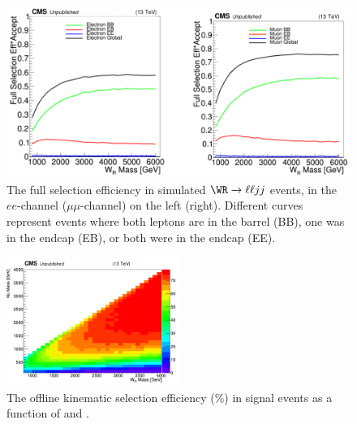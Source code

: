 \begin{figure}[h]
	\centering
	\includegraphics[width=1.0\textwidth]{figures/wrRecoSelectionEfficiency.png}
	\caption{The full selection efficiency in simulated $\WR \rightarrow \ell\ell jj$ events, in the $ee$-channel ($\mu\mu$-channel) 
		on the left (right).  Different curves represent events where both leptons are in the barrel (BB), one was in the 
	endcap (EB), or both were in the endcap (EE).}
	\label{fig:wrRecoSelectionEff}
\end{figure}

\begin{figure}[h]
	\centering
	\includegraphics[width=0.5\textwidth]{figures/genWrMuMuAccEff_NoMassWindows13TeV.png}
	\caption{The offline kinematic selection efficiency (\%) in signal events as a function of \mWR and \mnul.}
	\label{fig:wrOffSelEffVarMWrMNu}
\end{figure}


